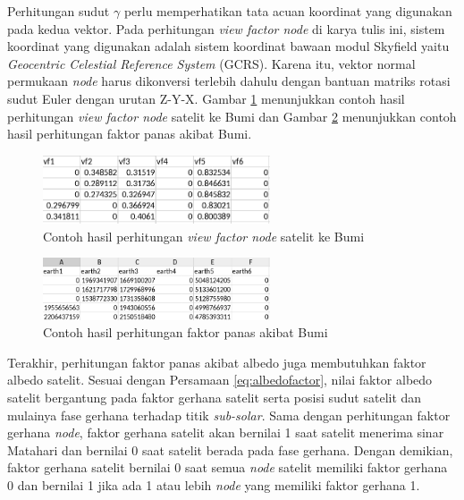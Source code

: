 Perhitungan sudut $\gamma$ perlu memperhatikan tata acuan koordinat yang
digunakan pada kedua vektor. Pada perhitungan \textit{view factor node} di
karya tulis ini, sistem koordinat yang digunakan adalah sistem koordinat bawaan
modul Skyfield yaitu \textit{Geocentric Celestial Reference System} (GCRS).
Karena itu, vektor normal permukaan \textit{node} harus dikonversi terlebih
dahulu dengan bantuan matriks rotasi sudut Euler dengan urutan Z-Y-X. Gambar
\ref{fig:vffig} menunjukkan contoh hasil perhitungan \textit{view factor node}
satelit ke Bumi dan Gambar \ref{fig:earthfactor} menunjukkan contoh hasil perhitungan faktor panas akibat Bumi.

\begin{figure}[H]
\setlength{}
\begin{center}
\includegraphics[width=0.6\textwidth]{fig/vffig.png}
\caption{Contoh hasil perhitungan \textit{view factor node} satelit ke Bumi}
\label{fig:vffig}
\end{center}
\end{figure}

\begin{figure}[H]
\setlength{}
\begin{center}
\includegraphics[width=0.6\textwidth]{fig/earthfactor.png}
\caption{Contoh hasil perhitungan faktor panas akibat Bumi}
\label{fig:earthfactor}
\end{center}
\end{figure}

Terakhir, perhitungan faktor panas akibat albedo juga membutuhkan faktor albedo
satelit. Sesuai dengan Persamaan \ref{eq:albedofactor}, nilai faktor albedo
satelit bergantung pada faktor gerhana satelit serta posisi sudut satelit dan
mulainya fase gerhana terhadap titik \textit{sub-solar}. Sama dengan
perhitungan faktor gerhana \textit{node}, faktor gerhana satelit akan bernilai
1 saat satelit menerima sinar Matahari dan bernilai 0 saat satelit berada pada
fase gerhana. Dengan demikian, faktor gerhana satelit bernilai 0 saat semua
\textit{node} satelit memiliki faktor gerhana 0 dan bernilai 1 jika ada 1 atau
lebih \textit{node} yang memiliki faktor gerhana 1.

